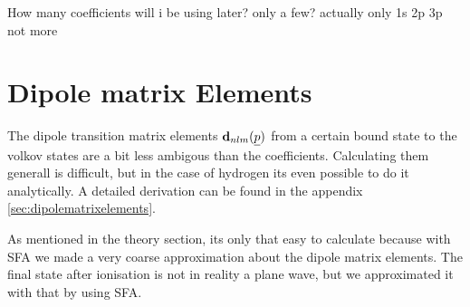 



\bigskip
How many coefficients will i be using later? only a few? actually only 1s 2p 3p not more


\section{Dipole matrix Elements}
The dipole transition matrix elements $\mathbf{d}_{nlm}(\underline{p})$ from a certain bound state to the volkov states are a bit less ambigous than the coefficients.
Calculating them generall is difficult, but in the case of hydrogen its even possible to do it analytically.
A detailed derivation can be found in the appendix \ref{sec:dipolematrixelements}.


As mentioned in the theory section, its only that easy to calculate because with SFA we made a very coarse approximation about the dipole matrix elements.
The final state after ionisation is not in reality a plane wave, but we approximated it with that by using SFA.

